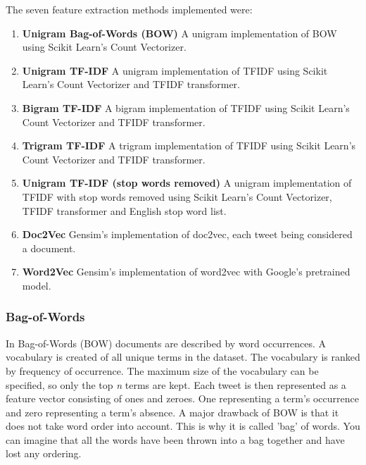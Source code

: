 The seven feature extraction methods implemented were:
\begin{enumerate}
    \item \textbf{Unigram Bag-of-Words (BOW)}\newline
    A unigram implementation of BOW using Scikit Learn's Count Vectorizer.
    \item \textbf{Unigram TF-IDF}\newline
    A unigram implementation of TFIDF using Scikit Learn's Count Vectorizer and TFIDF transformer.
    \item \textbf{Bigram TF-IDF}\newline
    A bigram implementation of TFIDF using Scikit Learn's Count Vectorizer and TFIDF transformer.
    \item \textbf{Trigram TF-IDF} \newline
    A trigram implementation of TFIDF using Scikit Learn's Count Vectorizer and TFIDF transformer.
    \item \textbf{Unigram TF-IDF (stop words removed)}\newline
    A unigram implementation of TFIDF with stop words removed using Scikit Learn's Count Vectorizer, TFIDF transformer and English stop word list.
    \item \textbf{Doc2Vec}\newline
    Gensim's implementation of doc2vec, each tweet being considered a document.
    \item \textbf{Word2Vec}\newline
    Gensim's implementation of word2vec with Google's pretrained model.
\end{enumerate}

\subsubsection{Bag-of-Words}

In Bag-of-Words (BOW) documents are described by word occurrences. A vocabulary is created of all unique terms in the dataset. The vocabulary is ranked by frequency of occurrence. The maximum size of the vocabulary can be specified, so only the top \textit{n} terms are kept. Each tweet is then represented as a feature vector consisting of ones and zeroes. One representing a term's occurrence and zero representing a term's absence. A major drawback of BOW is that it does not take word order into account. This is why it is called 'bag' of words. You can imagine that all the words have been thrown into a bag together and have lost any ordering.

